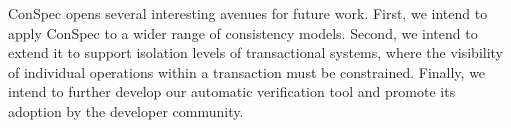 \documentclass[conference]{IEEEtran}
\begin{document}
	ConSpec opens several interesting avenues for future work. First, we intend to apply ConSpec to a wider range of consistency models. Second, we intend to extend it to support isolation levels of transactional systems, where the visibility of individual operations within a transaction must be constrained. Finally, we intend to further develop our automatic verification tool and promote its adoption by the developer community.
	
	
	
	
	
	
\end{document}
